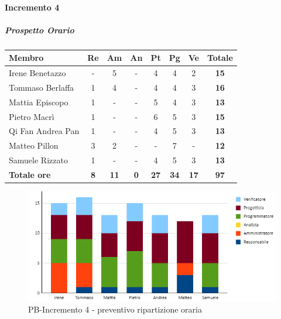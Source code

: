 \paragraph{Incremento 4}
\subparagraph{Prospetto Orario}
\begin{center}
	\renewcommand{\arraystretch}{1.8} %
	\begin{tabular}{ |m{10em}|c|c|c|c|c|c|c| }
	\hline
	\textbf{Membro} & \textbf{Re} & \textbf{Am} &  \textbf{An} &  \textbf{Pt} &  \textbf{Pg} &  \textbf{Ve} &  \textbf{Totale}\\
    \hline
    Irene Benetazzo   & - & 5 & - & 4 & 4 & 2 & \textbf{15} \\
    \hline
    Tommaso Berlaffa  & 1 & 4 & - & 4 & 4 & 3 & \textbf{16} \\
    \hline
    Mattia Episcopo   & 1 & - & - & 5 & 4 & 3 & \textbf{13} \\
    \hline
    Pietro Macrì      & 1 & - & - & 6 & 5 & 3 & \textbf{15} \\
    \hline
    Qi Fan Andrea Pan & 1 & - & - & 4 & 5 & 3 & \textbf{13} \\
    \hline
    Matteo Pillon     & 3 & 2 & - & - & 7 & - & \textbf{12} \\
    \hline
    Samuele Rizzato   & 1 & - & - & 4 & 5 & 3 & \textbf{13} \\
    \hline
    \textbf{Totale ore} & \textbf{8} & \textbf{11} &  \textbf{0} &  \textbf{27} &  \textbf{34} &  \textbf{17} &  \textbf{97}\\
    \hline
	\end{tabular}
\end{center}
\begin{figure}[H]
   \centering\includegraphics{images/preventivo/PB-incremento4-ore.png}
   \caption{PB-Incremento 4 - preventivo ripartizione oraria}
\end{figure}


